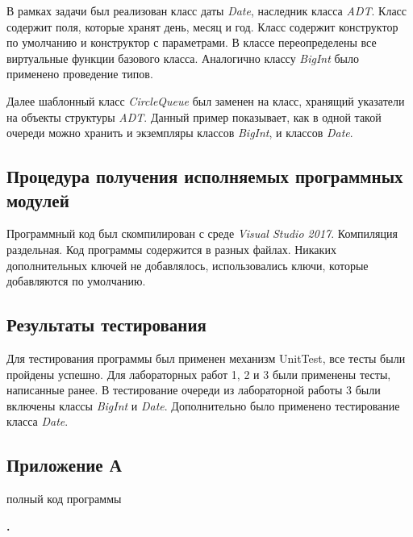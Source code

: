 \documentclass[a4paper,14pt]{article}
\begin{document}
В рамках задачи был реализован класс даты \textit{Date}, наследник класса \textit{ADT}. Класс содержит поля, которые хранят день, месяц и год. Класс содержит конструктор по умолчанию и конструктор с параметрами. В классе переопределены все виртуальные функции базового класса. Аналогично классу \textit{BigInt} было применено проведение типов.

Далее шаблонный класс \textit{CircleQueue} был заменен на класс, хранящий указатели на объекты структуры \textit{ADT}. Данный пример показывает, как в одной такой очереди можно хранить и экземпляры классов \textit{BigInt}, и классов \textit{Date}.

\subsection{Процедура получения исполняемых программных модулей}
Программный код был скомпилирован с среде \textit{Visual Studio 2017}. Компиляция раздельная. Код программы содержится в разных файлах. Никаких дополнительных ключей не добавлялось, использовались ключи, которые добавляются по умолчанию.
\subsection{Результаты тестирования}
Для тестирования программы был применен механизм UnitTest, все тесты были пройдены успешно.
Для лабораторных работ 1, 2 и 3 были применены тесты, написанные ранее. В тестирование очереди из лабораторной работы 3 были включены  классы \textit{BigInt} и \textit{Date}. Дополнительно было применено тестирование класса \textit{Date}.
\newpage
\setcounter{figure}{1} 
\setcounter{section}{1} 
\setcounter{subsection}{1} 

\begin{center}
	\section*{Приложение А}
	полный код программы
	
\end{center}

\renewcommand{\subsection}{.\arabic{subsection}}
\setcounter{subsection}{1} 
\textbf{\subsection{  - BigInt.h}}

\end{document}
